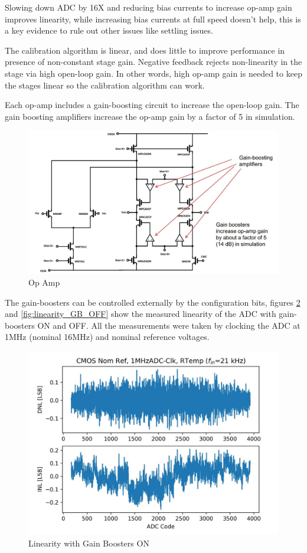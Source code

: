 Slowing down ADC by 16X and reducing bias currents to increase op-amp gain improves linearity, while increasing bias currents at full speed doesn’t help, this is a key evidence to rule out other issues like settling issues.

The calibration algorithm is linear, and does little to improve performance in presence of non-constant stage gain. Negative feedback rejects non-linearity in the stage via high open-loop gain. In other words, high op-amp gain is needed to keep the stages linear so the calibration algorithm can work.

Each op-amp includes a gain-boosting circuit to increase the open-loop gain. The gain boosting amplifiers increase the op-amp gain by a factor of 5 in simulation. 

\begin{figure}[h!]
\centering
  \includegraphics[width=0.9\linewidth]{figures/prakash_fig/op_amp.JPG}
  \caption{Op Amp}
  \label{fig:op_amp_1}
\end{figure}

The gain-boosters can be controlled externally by the configuration bits, figures \ref{fig:linearity_GB_ON} and \ref{fig:linearity_GB_OFF} show the measured linearity of the ADC with gain-boosters ON and OFF. All the measurements were taken by clocking the ADC at 1MHz (nominal 16MHz) and nominal reference voltages.  

\begin{figure}[h!]
\centering
  \includegraphics[width=0.6\linewidth]{figures/prakash_fig/linearity_GB_ON.JPG}
  \caption{Linearity with Gain Boosters ON}
  \label{fig:linearity_GB_ON}
\end{figure}

